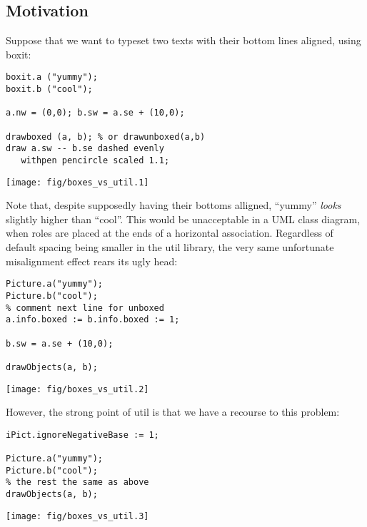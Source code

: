 \documentclass{article}
\newcommand{\code}{\ttfamily}
\begin{document}
\subsection{Motivation}

Suppose that we want to typeset two texts with their bottom lines aligned, using {\code boxit}:

\begin{multicols}{2}
\begin{verbatim}
boxit.a ("yummy");
boxit.b ("cool");

a.nw = (0,0); b.sw = a.se + (10,0);

drawboxed (a, b); % or drawunboxed(a,b)
draw a.sw -- b.se dashed evenly
   withpen pencircle scaled 1.1;
\end{verbatim}
\columnbreak
\hspace{1cm}\texttt{[image: fig/boxes\_vs\_util.1]}
\end{multicols}

Note that, despite supposedly having their bottoms alligned,
``yummy'' {\it looks} slightly higher than ``cool''. This would be unacceptable
in a UML class diagram, when roles are placed at the ends of a horizontal association.
Regardless of default spacing being smaller in the {\code util} library,
the very same unfortunate misalignment effect rears its ugly head:

\begin{multicols}{2}
\begin{verbatim}
Picture.a("yummy");
Picture.b("cool");
% comment next line for unboxed
a.info.boxed := b.info.boxed := 1;

b.sw = a.se + (10,0);

drawObjects(a, b);
\end{verbatim}
\columnbreak
\hspace{1cm}\texttt{[image: fig/boxes\_vs\_util.2]}
\end{multicols}

However, the strong point of {\code util} is that we have a recourse to this problem:

\begin{multicols}{2}
\begin{verbatim}
iPict.ignoreNegativeBase := 1;

Picture.a("yummy");
Picture.b("cool");
% the rest the same as above
drawObjects(a, b);
\end{verbatim}
\columnbreak
\hspace{1cm}\texttt{[image: fig/boxes\_vs\_util.3]}
\end{multicols}
\end{document}
